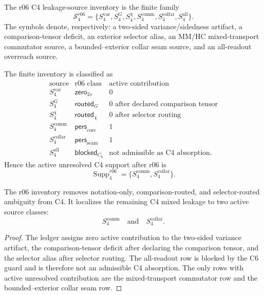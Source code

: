 \begin{definition}
\label{def:v470-r06-finite-c4-source-family}
The r06 C4 leakage-source inventory is the finite family
\[
\mathcal S_{4}^{r06}
=
\{S_4^{\mathrm{var}},S_4^{G},S_4^{\chi},S_4^{\mathrm{comm}},
S_4^{\mathrm{collar}},S_4^{\mathrm{all}}\}.
\]
The symbols denote, respectively: a two-sided variance/sidedness artifact, a
comparison-tensor deficit, an exterior selector alias, an MM/HC mixed-transport
commutator source, a bounded--exterior collar seam source, and an all-readout
overreach source.
\end{definition}

\begin{definition}
\label{def:v470-r06-c4-inventory-ledger}
The finite inventory is classified as
\[
\begin{array}{c|c|c}
\text{source} & \text{r06 class} & \text{active contribution}\\
\hline
S_4^{\mathrm{var}} & \mathsf{zero}_{2s} & 0\\
S_4^{G} & \mathsf{routed}_{G} & 0\text{ after declared comparison tensor}\\
S_4^{\chi} & \mathsf{routed}_{\chi} & 0\text{ after selector routing}\\
S_4^{\mathrm{comm}} & \mathsf{pers}_{\mathrm{core}} & 1\\
S_4^{\mathrm{collar}} & \mathsf{pers}_{\mathrm{seam}} & 1\\
S_4^{\mathrm{all}} & \mathsf{blocked}_{C_6} & \text{not admissible as C4 absorption}.
\end{array}
\]
Hence the active unresolved C4 support after r06 is
\[
\operatorname{Supp}_{4}^{r06}
=
\{S_4^{\mathrm{comm}},S_4^{\mathrm{collar}}\}.
\]
\end{definition}

\begin{lemma}
\label{lem:v470-r06-c4-source-localization}
The r06 inventory removes notation-only, comparison-routed, and selector-routed
ambiguity from C4.  It localizes the remaining C4 mixed leakage to two active
source classes:
\[
S_4^{\mathrm{comm}}\quad\text{and}\quad S_4^{\mathrm{collar}}.
\]
\end{lemma}

\begin{proof}
The ledger assigns zero active contribution to the two-sided variance artifact,
the comparison-tensor deficit after declaring the comparison tensor, and the
selector alias after selector routing.  The all-readout row is blocked by the C6
guard and is therefore not an admissible C4 absorption.  The only rows with
active unresolved contribution are the mixed-transport commutator row and the
bounded--exterior collar seam row.
\end{proof}

